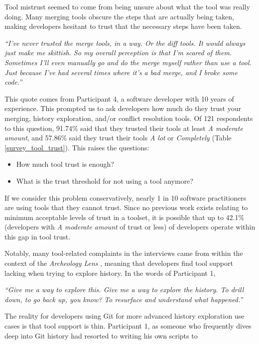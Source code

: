 Tool mistrust seemed to come from being unsure about what the tool was really doing. Many merging tools obscure the steps that are actually being taken, making developers hesitant to trust that the necessary steps have been taken. 
\begin{displayquote}
\textit{``I've never trusted the merge tools, in a way. Or the diff tools. It would always just make me skittish. So my overall perception is that I'm scared of them. Sometimes I'll even manually go and do the merge myself rather than use a tool. Just because I've had several times where it's a bad merge, and I broke some code.''}
\end{displayquote}
This quote comes from Participant 4, a software developer with 10 years of experience.
This prompted us to ask developers how much do they trust your merging, history exploration, and/or conflict resolution tools. Of 121 respondents to this question, 91.74\% said that they trusted their tools at least \textit{A moderate amount}, and 57.86\% said they trust their tools \textit{A lot} or \textit{Completely} (Table \ref{survey_tool_trust}). This raises the questions: 
\begin{itemize}
\item How much tool trust is enough? 
\item What is the trust threshold for not using a tool anymore?
\end{itemize}
If we consider this problem conservatively, nearly 1 in 10 software practitioners are using tools that they cannot trust. Since no previous work exists relating to minimum acceptable levels of trust in a toolset, it is possible that up to 42.1\% (developers with \textit{A moderate amount} of trust or less) of developers operate within this gap in tool trust.


Notably, many tool-related complaints in the interviews came from within the context of the \textit{Archeology Lens} \cite{mihai_lenses}, meaning that developers find tool support lacking when trying to explore history. In the words of Participant 1, 

\begin{displayquote}
\textit{``Give me a way to explore this. Give me a way to explore the history. To drill down, to go back up, you know? To resurface and understand what happened.''}
\end{displayquote}

The reality for developers using Git for more advanced history exploration use cases is that tool support is thin. Participant 1, as someone who frequently dives deep into Git history had resorted to writing his own scripts to 




